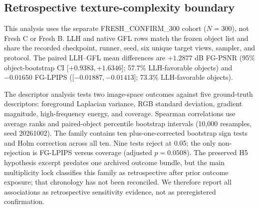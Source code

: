 \documentclass[11pt]{article}
\begin{document}
\subsection*{Retrospective texture-complexity boundary}
This analysis uses the separate FRESH\_CONFIRM\_300 cohort ($N=300$), not Fresh C or Fresh B. LLH and native GFL rows match the frozen object list and share the recorded checkpoint, runner, seed, six unique target views, sampler, and protocol. The paired LLH--GFL mean differences are $+1.2877$ dB FG-PSNR (95\% object-bootstrap CI [$+0.9383,+1.6346$]; 57.7\% LLH-favorable objects) and $-0.01650$ FG-LPIPS ([$-0.01887,-0.01413$]; 73.3\% LLH-favorable objects).

The descriptor analysis tests two image-space outcomes against five ground-truth descriptors: foreground Laplacian variance, RGB standard deviation, gradient magnitude, high-frequency energy, and coverage. Spearman correlations use average ranks and paired-object percentile bootstrap intervals (10,000 resamples, seed 20261002). The family contains ten plus-one-corrected bootstrap sign tests and Holm correction across all ten. Nine tests reject at 0.05; the only non-rejection is FG-LPIPS versus coverage (adjusted $p=0.0508$). The preserved H5 hypothesis excerpt predates one archived outcome bundle, but the main multiplicity lock classifies this family as retrospective after prior outcome exposure; that chronology has not been reconciled. We therefore report all associations as retrospective sensitivity evidence, not as preregistered confirmation.
\end{document}
